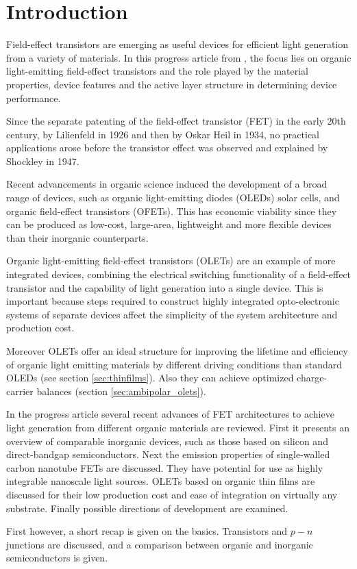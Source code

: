 \section{Introduction}
Field-effect transistors are emerging as useful devices for efficient light generation from a variety of materials. In this progress article from \citet{Muccini}, the focus lies on organic light-emitting field-effect transistors and the role played by the material properties, device features and the active layer structure in determining device performance.

Since the separate patenting of the field-effect transistor (FET) in the early 20th century, by Lilienfeld in 1926 and then by Oskar Heil in 1934, no practical applications arose before the transistor effect was observed and explained by Shockley in 1947.

Recent advancements in organic science induced the development of a broad range of devices, such as organic light-emitting diodes (OLEDs) solar cells, and organic field-effect transistors (OFETs). This has economic viability since they can be produced as low-cost, large-area, lightweight and more flexible devices than their inorganic counterparts.

Organic light-emitting field-effect transistors (OLETs) are an example of more integrated devices, combining the electrical switching functionality of a field-effect transistor and the capability of light generation into a single device. This is important because steps required to construct highly integrated opto-electronic systems of separate devices affect the simplicity of the system architecture and production cost.

Moreover OLETs offer an ideal structure for improving the lifetime and efficiency of organic light emitting materials by different driving conditions than standard OLEDs (see section \ref{sec:thinfilms}). Also they can achieve optimized charge-carrier balances (section \ref{sec:ambipolar_olets}).

In the progress article several recent advances of FET architectures to achieve light generation from different organic materials are reviewed. First it presents an overview of comparable inorganic devices, such as those based on silicon and direct-bandgap semiconductors. Next the emission properties of single-walled carbon nanotube FETs are discussed. They have potential for use as highly integrable nanoscale light sources. OLETs based on organic thin films are discussed for their low production cost and ease of integration on virtually any substrate. Finally possible directions of development are examined.

First however, a short recap is given on the basics. Transistors and $p-n$ junctions are discussed, and a comparison between organic and inorganic semiconductors is given.